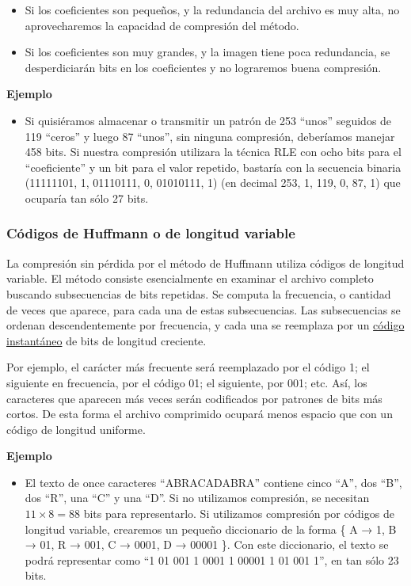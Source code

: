\documentclass[spanish,A4,]{article}
\begin{document}
\begin{itemize}
\itemsep1pt\parskip0pt
\item
  Si los coeficientes son pequeños, y la redundancia del archivo es muy
  alta, no aprovecharemos la capacidad de compresión del método.
\item
  Si los coeficientes son muy grandes, y la imagen tiene poca
  redundancia, se desperdiciarán bits en los coeficientes y no
  lograremos buena compresión.
\end{itemize}

\textbf{Ejemplo}

\begin{itemize}
\itemsep1pt\parskip0pt
\item
  Si quisiéramos almacenar o transmitir un patrón de 253 ``unos''
  seguidos de 119 ``ceros'' y luego 87 ``unos'', sin ninguna compresión,
  deberíamos manejar 458 bits. Si nuestra compresión utilizara la
  técnica RLE con ocho bits para el ``coeficiente'' y un bit para el
  valor repetido, bastaría con la secuencia binaria (11111101, 1,
  01110111, 0, 01010111, 1) (en decimal 253, 1, 119, 0, 87, 1) que
  ocuparía tan sólo 27 bits.
\end{itemize}

\subsubsection{Códigos de Huffmann o de longitud
variable}\label{cuxf3digos-de-huffmann-o-de-longitud-variable}

La compresión sin pérdida por el método de Huffmann utiliza códigos de
longitud variable. El método consiste esencialmente en examinar el
archivo completo buscando subsecuencias de bits repetidas. Se computa la
frecuencia, o cantidad de veces que aparece, para cada una de estas
subsecuencias. Las subsecuencias se ordenan descendentemente por
frecuencia, y cada una se reemplaza por un
\href{https://es.m.wikipedia.org/wiki/C\%C3\%B3digo_prefijo}{código
instantáneo} de bits de longitud creciente.

Por ejemplo, el carácter más frecuente será reemplazado por el código 1;
el siguiente en frecuencia, por el código 01; el siguiente, por 001;
etc. Así, los caracteres que aparecen más veces serán codificados por
patrones de bits más cortos. De esta forma el archivo comprimido ocupará
menos espacio que con un código de longitud uniforme.

\textbf{Ejemplo}

\begin{itemize}
\itemsep1pt\parskip0pt
\item
  El texto de once caracteres ``ABRACADABRA'' contiene cinco ``A'', dos
  ``B'', dos ``R'', una ``C'' y una ``D''. Si no utilizamos compresión,
  se necesitan $11 \times 8 = 88$ bits para representarlo. Si utilizamos
  compresión por códigos de longitud variable, crearemos un pequeño
  diccionario de la forma \{ A → 1, B → 01, R → 001, C → 0001, D → 00001
  \}. Con este diccionario, el texto se podrá representar como ``1 01
  001 1 0001 1 00001 1 01 001 1'', en tan sólo 23 bits.
\end{itemize}
\end{document}

